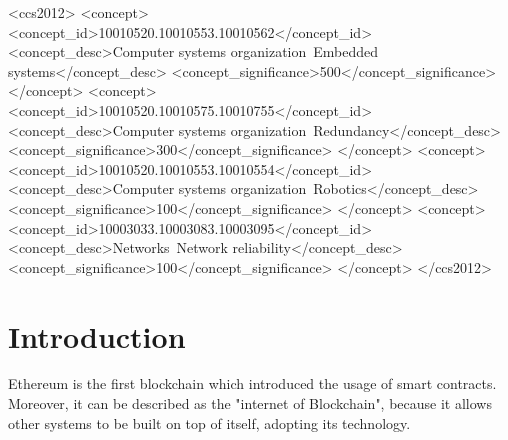 \documentclass[a4paper,sigconf, language=french,
language=german, language=spanish, language=english]{acmart}
\begin{document}
\begin{CCSXML}
<ccs2012>
 <concept>
  <concept_id>10010520.10010553.10010562</concept_id>
  <concept_desc>Computer systems organization~Embedded systems</concept_desc>
  <concept_significance>500</concept_significance>
 </concept>
 <concept>
  <concept_id>10010520.10010575.10010755</concept_id>
  <concept_desc>Computer systems organization~Redundancy</concept_desc>
  <concept_significance>300</concept_significance>
 </concept>
 <concept>
  <concept_id>10010520.10010553.10010554</concept_id>
  <concept_desc>Computer systems organization~Robotics</concept_desc>
  <concept_significance>100</concept_significance>
 </concept>
 <concept>
  <concept_id>10003033.10003083.10003095</concept_id>
  <concept_desc>Networks~Network reliability</concept_desc>
  <concept_significance>100</concept_significance>
 </concept>
</ccs2012>
\end{CCSXML}






\maketitle

\section{Introduction}
Ethereum is the first blockchain which introduced the usage of smart contracts. Moreover, it can be described as the "internet of Blockchain", because it allows other systems to be built on top of itself, adopting its technology.
\end{document}
